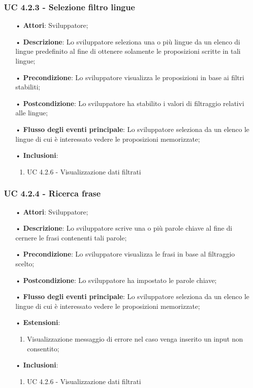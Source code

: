 \subsubsection{UC 4.2.3 -  Selezione filtro lingue}
\begin{itemize}
\item[•]\textbf{Attori}: Sviluppatore;
\item[•]\textbf{Descrizione}: Lo sviluppatore seleziona una o più lingue da un elenco di lingue predefinito al fine di ottenere solamente le proposizioni scritte in tali lingue;
\item[•]\textbf{Precondizione}: Lo sviluppatore visualizza le proposizioni in base ai filtri stabiliti;
\item[•]\textbf{Postcondizione}: Lo sviluppatore ha stabilito i valori di filtraggio relativi alle lingue;
\item[•]\textbf{Flusso degli eventi principale}: Lo sviluppatore seleziona da un elenco le lingue di cui è interessato vedere le proposizioni memorizzate;
\item[•]\textbf{Inclusioni}:
\begin{enumerate}
\item UC 4.2.6 - Visualizzazione dati filtrati
\end{enumerate}
\end{itemize}

\subsubsection{UC 4.2.4 - Ricerca frase}
\begin{itemize}
\item[•]\textbf{Attori}: Sviluppatore;
\item[•]\textbf{Descrizione}: Lo sviluppatore scrive una o più parole chiave al fine di cernere le frasi contenenti tali parole;
\item[•]\textbf{Precondizione}: Lo sviluppatore visualizza le frasi in base al filtraggio scelto;
\item[•]\textbf{Postcondizione}: Lo sviluppatore ha impostato le parole chiave;
\item[•]\textbf{Flusso degli eventi principale}: Lo sviluppatore seleziona da un elenco le lingue di cui è interessato vedere le proposizioni memorizzate;
\item[•]\textbf{Estensioni}: 
\begin{enumerate}
	\item Visualizzazione messaggio di errore nel caso venga inserito un input non consentito;
\end{enumerate}
\item[•]\textbf{Inclusioni}:
\begin{enumerate}
\item UC 4.2.6 - Visualizzazione dati filtrati
\end{enumerate}
\end{itemize}


